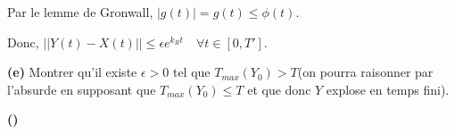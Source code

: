 \documentclass[french]{article}
\begin{document}
	Par le lemme de Gronwall, $|g(t)| = g(t) \leq \phi(t)$.
	
	Donc, $ || Y(t) - X(t) || \leq \epsilon e^{k_Rt} \quad \forall t \in [0, T']$.
	
	\begin{tcolorbox}[colback=gray!5!white,colframe=gray!75!black]
		\textbf{\large{(e)}} Montrer qu'il existe $\epsilon > 0$ tel que $T_{max}(Y_0) > T$(on pourra raisonner par l'absurde en supposant que $T_{max}(Y_0) \leq T$ et que donc $Y$ explose en temps fini). 
	\end{tcolorbox}
	
	


	\begin{tcolorbox}[colback=gray!5!white,colframe=gray!75!black]
		\textbf{\large{()}} 
	\end{tcolorbox}
\end{document}
